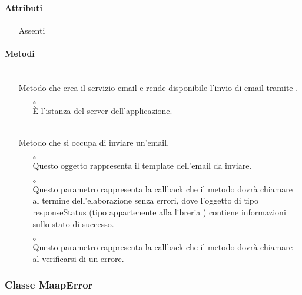 \paragraph*{Attributi}
\begin{itemize}
\item[] Assenti
\end{itemize}

\paragraph*{Metodi}
\begin{itemize}
\item[]  \\ Metodo che crea il servizio email e rende disponibile l'invio di email tramite .
\begin{itemize}\addtolength{\itemsep}{-0.5\baselineskip}
\item[$\circ$]  \\ È l'istanza del server dell'applicazione.
\end{itemize}
\item[]  \\ Metodo che si occupa di inviare un'email.
\begin{itemize}\addtolength{\itemsep}{-0.5\baselineskip}
\item[$\circ$]  \\ Questo oggetto rappresenta il template dell'email da inviare.
\item[$\circ$]  \\ Questo parametro rappresenta la callback che il metodo dovrà chiamare al termine dell'elaborazione senza errori, dove l'oggetto di tipo responseStatus (tipo appartenente alla libreria ) contiene informazioni sullo stato di successo.
\item[$\circ$]  \\ Questo parametro rappresenta la callback che il metodo dovrà chiamare al verificarsi di un errore.
\end{itemize}
\end{itemize}

\subsubsection{Classe MaapError}

